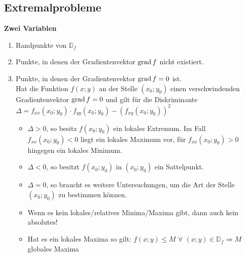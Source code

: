 \subsection{Extremalprobleme}
  \textbf{Zwei Variablen}
  \begin{enumerate}
    \item 
      Randpunkte von $\mathbb{D}_f$
    \item 
      Punkte, in denen der Gradientenvektor $\operatorname{grad} f$ nicht existiert. 
    \item 
      Punkte, in denen der Gradientenvektor $\operatorname{grad} f=0$ ist.\\
      Hat die Funktion $f(x;y)$ an der Stelle $(x_0;y_0)$ einen verschwindenden Gradientenvektor $\operatorname{grad} f = 0$ 
      und gilt für die Diskriminante $\Delta = f_{xx}    (x_0;y_0) \cdot f_{yy}(x_0;y_0) -  (f_{xy}(x_0;y_0))^2$
      \begin{itemize}
        \item 
          $\Delta > 0 $, so besitz $f(x_0;y_0)$ ein lokales Extremum. Im Fall $f_{xx}(x_0;y_0) < 0$ liegt ein lokales Maximum vor, 
          für $f_{xx}(x_0;y_0) > 0$ hingegen ein lokales Minimum.
        \item
          $\Delta < 0 $, so besitzt $f(x_0;y_0)$ in $(x_0;y_0)$ ein Sattelpunkt.
        \item 
          $\Delta = 0 $, so braucht es weitere Untersuchungen, um die Art der Stelle $(x_0;y_0)$ zu bestimmen können.
        \item 
          Wenn es kein lokales/relatives Minima/Maxima gibt, dann auch kein absolutes!
        \item
          Hat es ein lokales Maxima so gilt: $f(x;y) \leq M$ $\forall$ $(x;y) \in \mathbb{D}_f \Rightarrow M$ globales Maxima
      \end{itemize}
    \end{enumerate}
  

